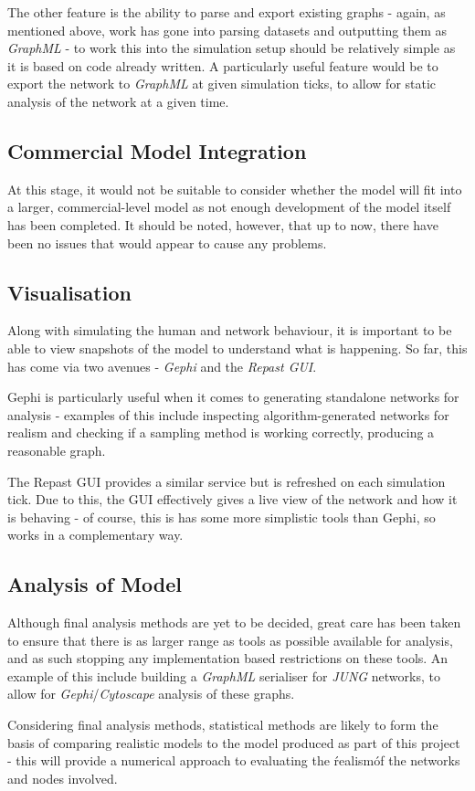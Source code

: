 \documentclass[]{article}
\begin{document}
The other feature is the ability to parse and export existing graphs - again, as mentioned above, work has gone into parsing datasets and outputting them as \emph{GraphML} - to work this into the simulation setup should be relatively simple as it is based on code already written. A particularly useful feature would be to export the network to \emph{GraphML} at given simulation ticks, to allow for static analysis of the network at a given time. 

\subsection{Commercial Model Integration}

At this stage, it would not be suitable to consider whether the model will fit into a larger, commercial-level model as not enough development of the model itself has been completed. It should be noted, however, that up to now, there have been no issues that would appear to cause any problems. 

\subsection{Visualisation}

Along with simulating the human and network behaviour, it is important to be able to view snapshots of the model to understand what is happening. So far, this has come via two avenues - \emph{Gephi} and the \emph{Repast GUI}. 

Gephi is particularly useful when it comes to generating standalone networks for analysis - examples of this include inspecting algorithm-generated networks for realism and checking if a sampling method is working correctly, producing a reasonable graph.

The Repast GUI provides a similar service but is refreshed on each simulation tick. Due to this, the GUI effectively gives a live view of the network and how it is behaving - of course, this is has some more simplistic tools than Gephi, so works in a complementary way.

\subsection{Analysis of Model}

Although final analysis methods are yet to be decided, great care has been taken to ensure that there is as larger range as tools as possible available for analysis, and as such stopping any implementation based restrictions on these tools. An example of this include building a \emph{GraphML} serialiser for \emph{JUNG} networks, to allow for \emph{Gephi}/\emph{Cytoscape} analysis of these graphs.

Considering final analysis methods, statistical methods are likely to form the basis of comparing realistic models to the model produced as part of this project - this will provide a numerical approach to evaluating the \'realism\' of the networks and nodes involved.
\end{document}
